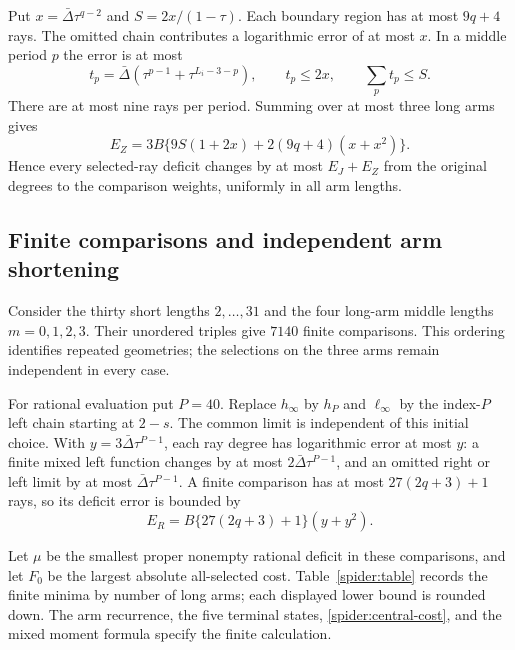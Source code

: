 Put $x=\bar\Delta\tau^{q-2}$ and $S=2x/(1-\tau)$. Each boundary region
has at most $9q+4$ rays. The omitted chain contributes a logarithmic error
of at most $x$.
In a middle period $p$ the error is at most
\[
 t_p=\bar\Delta(\tau^{p-1}+\tau^{L_i-3-p}),\qquad
 t_p\le2x,\qquad \sum_pt_p\le S.
\]
There are at most nine rays per period. Summing over at most three
long arms gives
\begin{equation}\label{spider:zone-error}
 E_Z=3B\{9S(1+2x)+2(9q+4)(x+x^2)\}.
\end{equation}
Hence every selected-ray deficit changes by at most $E_J+E_Z$ from
the original degrees to the comparison weights, uniformly in all arm lengths.

\subsection{Finite comparisons and independent arm shortening}

Consider the thirty short lengths $2,\ldots,31$ and the four long-arm
middle lengths $m=0,1,2,3$. Their unordered triples give $7140$ finite
comparisons. This ordering identifies repeated geometries; the selections
on the three arms remain independent in every case.

For rational evaluation put $P=40$. Replace $h_\infty$ by $h_P$ and
$\ell_\infty$ by the index-$P$ left chain starting at $2-s$. The
common limit is independent of this initial choice. With
$y=3\bar\Delta\tau^{P-1}$, each ray degree has logarithmic error at
most $y$: a finite mixed left function changes by at most
$2\bar\Delta\tau^{P-1}$, and an omitted right or left limit by at
most $\bar\Delta\tau^{P-1}$. A finite comparison has at most
$27(2q+3)+1$ rays, so its deficit error is bounded by
\begin{equation}\label{spider:proxy-error}
 E_R=B\{27(2q+3)+1\}(y+y^2).
\end{equation}

Let $\mu$ be the smallest proper nonempty rational deficit in these
comparisons, and let $F_0$ be the largest absolute all-selected cost.
Table~\ref{spider:table} records the finite minima by number of long
arms; each displayed lower bound is rounded down. The arm recurrence,
the five terminal states, \eqref{spider:central-cost}, and the mixed
moment formula specify the finite calculation.



